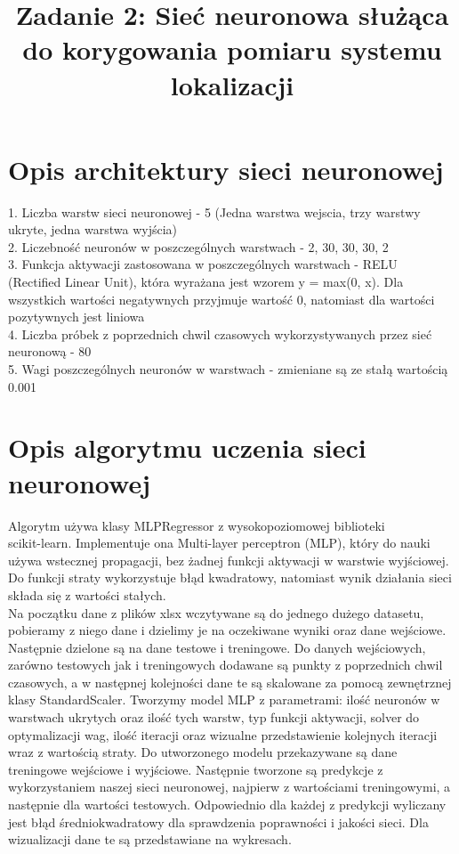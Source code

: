 \documentclass{classrep}
\author{
  \studentinfo{Maciej Pracucik}{216869} \and
  \studentinfo{Adam Jóźwiak}{216786}
}
\title{\textbf{Zadanie 2: Sieć neuronowa służąca do korygowania pomiaru systemu lokalizacji}}
\begin{document}
\maketitle

\section{Opis architektury sieci neuronowej}
{
	1. Liczba warstw sieci neuronowej - 5 (Jedna warstwa wejscia, trzy warstwy ukryte, jedna warstwa wyjścia) \\
	2. Liczebność neuronów w poszczególnych warstwach - 2, 30, 30, 30, 2 \\
	3. Funkcja aktywacji zastosowana w poszczególnych warstwach - RELU \\ (Rectified Linear Unit), która wyrażana jest wzorem y = max(0, x). Dla wszystkich wartości negatywnych przyjmuje wartość 0, natomiast dla wartości pozytywnych jest liniowa \\
	4. Liczba próbek z poprzednich chwil czasowych wykorzystywanych przez sieć neuronową - 80 \\
	5. Wagi poszczególnych neuronów w warstwach - zmieniane są ze stałą wartością 0.001 \\
 }

\section{Opis algorytmu uczenia sieci neuronowej}
{
	Algorytm używa klasy MLPRegressor z wysokopoziomowej biblioteki \\scikit-learn. Implementuje ona Multi-layer perceptron (MLP), który do nauki używa wstecznej propagacji, bez żadnej 
	funkcji aktywacji w warstwie wyjściowej. Do funkcji straty wykorzystuje błąd kwadratowy, natomiast wynik działania sieci składa się z wartości stałych. \\
	Na początku dane z plików xlsx wczytywane są do jednego dużego datasetu, pobieramy z niego dane i dzielimy je na oczekiwane wyniki oraz dane wejściowe.
	Następnie dzielone są na dane testowe i treningowe.
	Do danych wejściowych, zarówno testowych jak i treningowych dodawane są punkty z poprzednich chwil czasowych, a w następnej kolejności dane te są skalowane za pomocą zewnętrznej klasy StandardScaler. Tworzymy model MLP z parametrami: ilość neuronów w warstwach ukrytych oraz ilość tych warstw, typ funkcji aktywacji, solver do optymalizacji wag, ilość iteracji oraz wizualne 		przedstawienie kolejnych iteracji wraz z wartością straty. Do utworzonego modelu przekazywane są dane treningowe wejściowe i wyjściowe. Następnie tworzone są predykcje z wykorzystaniem naszej sieci neuronowej, najpierw z wartościami treningowymi, a następnie dla wartości testowych. Odpowiednio dla  każdej z predykcji wyliczany jest błąd średniokwadratowy dla sprawdzenia 			poprawności i jakości sieci. Dla wizualizacji dane te są przedstawiane na wykresach.
}
\end{document}
